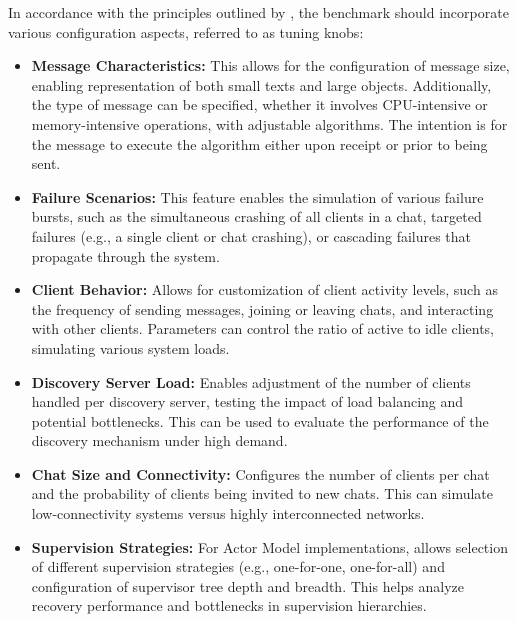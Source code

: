 In accordance with the principles outlined by \textcite{Randtoul2022}, the benchmark should incorporate various configuration aspects, referred to as tuning knobs:

\begin{itemize}
    \item \textbf{Message Characteristics:} This allows for the configuration of message size, enabling representation of both small texts and large objects. Additionally, the type of message can be specified, whether it involves \gls{CPU}-intensive or memory-intensive operations, with adjustable algorithms. The intention is for the message to execute the algorithm either upon receipt or prior to being sent.

    \item \textbf{Failure Scenarios:} This feature enables the simulation of various failure bursts, such as the simultaneous crashing of all clients in a chat, targeted failures (e.g., a single client or chat crashing), or cascading failures that propagate through the system.

    \item \textbf{Client Behavior:} Allows for customization of client activity levels, such as the frequency of sending messages, joining or leaving chats, and interacting with other clients. Parameters can control the ratio of active to idle clients, simulating various system loads.

    \item \textbf{Discovery Server Load:} Enables adjustment of the number of clients handled per discovery server, testing the impact of load balancing and potential bottlenecks. This can be used to evaluate the performance of the discovery mechanism under high demand.

    \item \textbf{Chat Size and Connectivity:} Configures the number of clients per chat and the probability of clients being invited to new chats. This can simulate low-connectivity systems versus highly interconnected networks.

    \item \textbf{Supervision Strategies:} For Actor Model implementations, allows selection of different supervision strategies (e.g., one-for-one, one-for-all) and configuration of supervisor tree depth and breadth. This helps analyze recovery performance and bottlenecks in supervision hierarchies.

\end{itemize}

